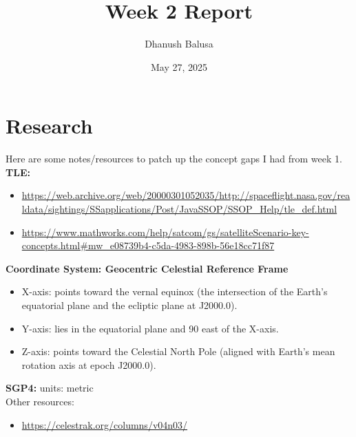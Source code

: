 \documentclass[12pt]{report}
\title{Week 2 Report}
\author{Dhanush Balusa}
\date{May 27, 2025}
\begin{document}
\maketitle

\chapter*{Research}

Here are some notes/resources to patch up the concept gaps I had from week 1.\\

\textbf{TLE:}
\begin{itemize}
  \item \url{https://web.archive.org/web/20000301052035/http://spaceflight.nasa.gov/realdata/sightings/SSapplications/Post/JavaSSOP/SSOP_Help/tle_def.html}
  \item \url{https://www.mathworks.com/help/satcom/gs/satelliteScenario-key-concepts.html#mw_e08739b4-c5da-4983-898b-56e18cc71f87}
\end{itemize}

\textbf{Coordinate System: Geocentric Celestial Reference Frame}
\begin{itemize}
  \item X-axis: points toward the vernal equinox (the intersection of the Earth's equatorial plane and the ecliptic plane at J2000.0).
  \item Y-axis: lies in the equatorial plane and 90\textdegree{} east of the X-axis.
  \item Z-axis: points toward the Celestial North Pole (aligned with Earth's mean rotation axis at epoch J2000.0).
\end{itemize}

\textbf{SGP4:} units: metric\\

Other resources:
\begin{itemize}
  \item \url{https://celestrak.org/columns/v04n03/}
\end{itemize}
\end{document}

